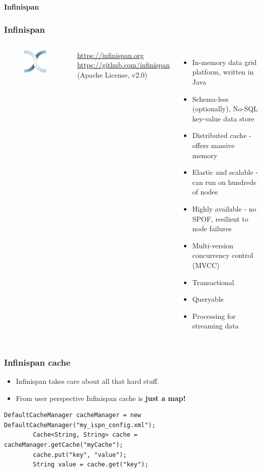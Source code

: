 \documentclass[10pt,utf8]{beamer}
\begin{document}
\begin{frame}
	\centering
	\huge{\textbf{Infinispan}}
\end{frame}

\begin{frame}
	\frametitle{Infinispan}
	\begin{columns}
		\begin{figure}
			\centering
			\includegraphics[width=3cm]{./img/infinispan.eps}
		\end{figure}
		\vspace{0.38cm}
		\color{blue}
			\url{https://infinispan.org}\\
			\vspace{0.1cm}
			\scriptsize{\url{https://github.com/infinispan}}\\
		\color{black}
		\scriptsize{(Apache License, v2.0)}
		\begin{itemize}
			\item In-memory data grid platform, written in Java
			\pause
			\item Schema-less (optionally), No-SQL key-value data store
			\pause
			\item Distributed cache - offers massive memory
			\pause
			\item Elastic and scalable - can run on hundreds of nodes
			\pause
			\item Highly available - no SPOF, resilient to node failures
			\pause
			\item Multi-version concurrency control (MVCC)
			\pause
			\item Transactional
			\pause
			\item Queryable
			\pause
			\item Processing for streaming data
		\end{itemize}
	\end{columns}
\end{frame}

\begin{frame}[fragile]
	\frametitle{Infinispan cache}
	\begin{itemize}
		\item Infinispan takes care about all that hard stuff.
		\item From user perspective Infinispan cache is \textbf{just a map!}
	\end{itemize}
	\vspace{0.3cm}
	\begin{lstlisting}[style=Java]
		DefaultCacheManager cacheManager = new DefaultCacheManager("my_ispn_config.xml");
		Cache<String, String> cache = cacheManager.getCache("myCache");
		cache.put("key", "value");
		String value = cache.get("key");
	\end{lstlisting}
\end{frame}
\end{document}
